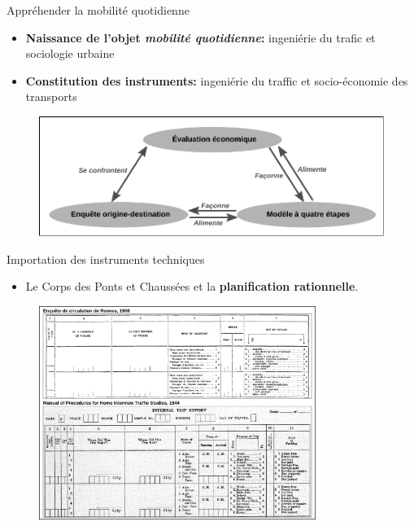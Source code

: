 \documentclass{beamer}
\begin{document}
\begin{frame}{Appréhender la mobilité quotidienne}

\begin{itemize}
  \item \textbf{Naissance de l'objet \textit{mobilité quotidienne}:} ingeniérie du trafic et sociologie urbaine
  \item \textbf{Constitution des instruments:} ingeniérie du traffic et socio-économie des transports
\end{itemize}

\begin{figure}
  \includegraphics[width=12cm]{Interrelations.pdf}
\end{figure}

\end{frame}


\begin{frame}{Importation des instruments techniques}

\begin{itemize}
  \item Le Corps des Ponts et Chaussées et la \textbf{planification rationnelle}.
\end{itemize}

\begin{figure}
  \includegraphics[width=9cm]{EMDRennes.pdf}
\end{figure}

\end{frame}
\end{document}
